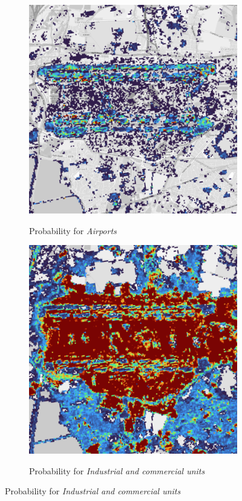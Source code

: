 \begin{figure}[H]
        \begin{subfigure}[b]{0.48\textwidth}
            \centering
            \caption{Probability for \textit{Airports}}
            \includegraphics[width=\textwidth,height=0.7\textwidth]{figs_06/heathrow_p_airport.png}
            \label{fig:heathrow_airport}
        \end{subfigure}
        \hfill
        \begin{subfigure}[b]{0.48\textwidth}
            \centering
            \caption{Probability for \textit{Industrial and commercial units}}
            \includegraphics[width=\textwidth,height=0.7\textwidth]{figs_06/heathrow_p_industrial_commercial.png}
            \label{fig:heathrow_industrial-commercial}
        \end{subfigure}

        \vspace{0.5em}
        

\end{figure}
